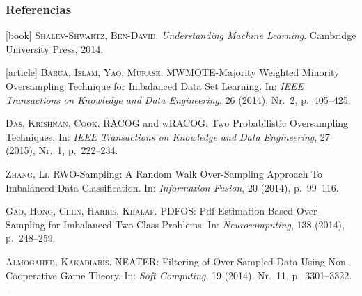 \begin{frame}\frametitle{Referencias}
 \fontsize{8pt}{0}\selectfont
 \vspace{2em}
 \begin{thebibliography}{99}
  [book]
     \textsc{Shalev-Shwartz, Ben-David}.
     \newblock \emph{Understanding Machine Learning}.
     \newblock Cambridge University Press, 2014.
   
   [article]
     \textsc{Barua, Islam, Yao, Murase}.
     \newblock MWMOTE-Majority Weighted Minority Oversampling Technique for
       Imbalanced Data Set Learning.
     \newblock In: \emph{IEEE Transactions on Knowledge and Data Engineering}, 26 (2014), Nr.~2, p.~405--425.

     \textsc{Das, Krishnan, Cook}.
     \newblock RACOG and wRACOG: Two Probabilistic Oversampling Techniques.
     \newblock In: \emph{IEEE Transactions on Knowledge and Data Engineering}, 27 (2015), Nr.~1, p.~222--234.
   
     \textsc{Zhang, Li}.
     \newblock RWO-Sampling: A Random Walk Over-Sampling Approach To Imbalanced Data Classification.
     \newblock In: \emph{Information Fusion}, 20 (2014), p.~99--116.
     
     \textsc{Gao, Hong, Chen, Harris, Khalaf}.
     \newblock PDFOS: Pdf Estimation Based Over-Sampling for Imbalanced Two-Class Problems.
     \newblock In: \emph{Neurocomputing}, 138 (2014), p.~248--259.
     
     \textsc{Almogahed, Kakadiaris}.
     \newblock NEATER: Filtering of Over-Sampled Data Using Non-Cooperative Game Theory.
     \newblock In: \emph{Soft Computing}, 19 (2014), Nr.~11, p.~3301--3322. --

 \end{thebibliography}
\end{frame}
